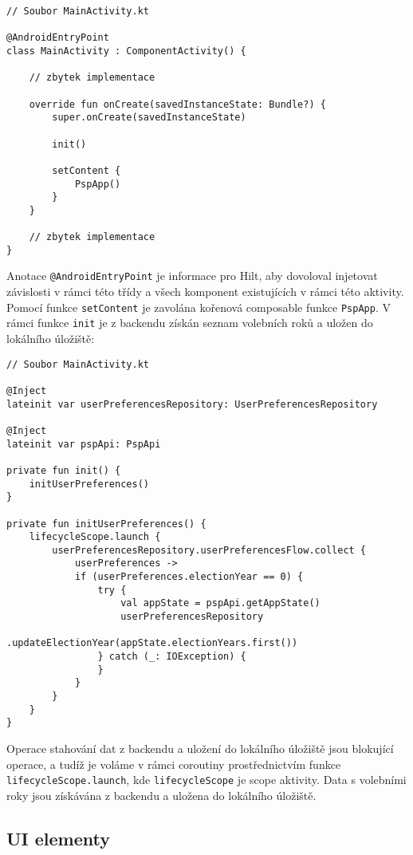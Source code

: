 \begin{lstlisting}[caption={Třída activity}, tabsize=2]
// Soubor MainActivity.kt

@AndroidEntryPoint
class MainActivity : ComponentActivity() {
	
	// zbytek implementace
	
	override fun onCreate(savedInstanceState: Bundle?) {
		super.onCreate(savedInstanceState)
		
		init()
		
		setContent {
			PspApp()
		}
	}

	// zbytek implementace
}
\end{lstlisting}

\noindent Anotace \lstinline|@AndroidEntryPoint| je informace pro Hilt, aby dovoloval injetovat závislosti v rámci této třídy a všech komponent existujících v rámci této aktivity. Pomocí funkce \lstinline|setContent| je zavolána kořenová composable funkce \lstinline|PspApp|. V rámci funkce \lstinline|init| je z backendu získán seznam volebních roků a uložen do lokálního úložiště:

\begin{lstlisting}[caption={Třída activity}, tabsize=2]
// Soubor MainActivity.kt

@Inject
lateinit var userPreferencesRepository: UserPreferencesRepository

@Inject
lateinit var pspApi: PspApi

private fun init() {
	initUserPreferences()
}

private fun initUserPreferences() {
	lifecycleScope.launch {
		userPreferencesRepository.userPreferencesFlow.collect { 
			userPreferences ->
			if (userPreferences.electionYear == 0) {
				try {
					val appState = pspApi.getAppState()
					userPreferencesRepository
						.updateElectionYear(appState.electionYears.first())
				} catch (_: IOException) {
				}
			}
		}
	}
}
\end{lstlisting}

\noindent Operace stahování dat z backendu a uložení do lokálního úložiště jsou blokující operace, a tudíž je voláme v rámci coroutiny prostřednictvím funkce \lstinline|lifecycleScope.launch|, kde \lstinline|lifecycleScope| je scope aktivity. Data s volebními roky jsou získávána z backendu a uložena do lokálního úložiště.

\subsection*{UI elementy}

